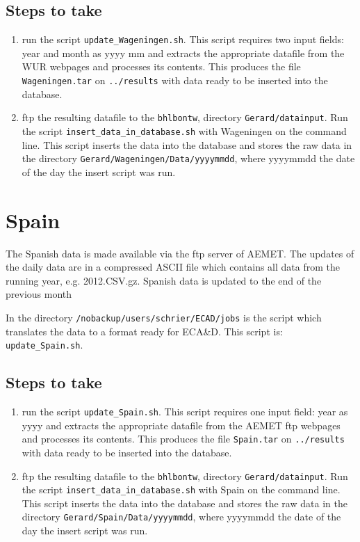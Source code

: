 \documentclass[a4paper]{article}
\begin{document}
\subsection*{Steps to take}

\begin{enumerate}
\item run the script \texttt{update\_Wageningen.sh}. This script requires two input fields: year and month
as yyyy mm and extracts the appropriate datafile from the WUR webpages and processes its contents. 
This produces the file \texttt{Wageningen.tar} on \texttt{../results} with data ready to be 
inserted into the database.
\item ftp the resulting datafile to the \texttt{bhlbontw},
directory \texttt{Gerard/datainput}. Run the script \texttt{insert\_data\_in\_database.sh} with Wageningen
on the command line. This script inserts the data into the database and stores the raw
data in the directory \texttt{Gerard/Wageningen/Data/yyyymmdd}, where yyyymmdd the date of the day the insert
script was run.
\end{enumerate}


\section{Spain}
The Spanish data is made available via the ftp server of AEMET. The updates of the daily data are in a compressed
ASCII file which contains all data from the running year, e.g. 2012.CSV.gz. Spanish data is updated to the end 
of the previous month

In the directory
\texttt{/nobackup/users/schrier/ECAD/jobs} is the script which translates the data to
a  format ready for ECA\&D.
This script is: \texttt{update\_Spain.sh}.

\subsection*{Steps to take}

\begin{enumerate}
\item run the script \texttt{update\_Spain.sh}. This script requires one input field: year 
as yyyy and extracts the appropriate datafile from the AEMET ftp webpages and processes its contents. 
This produces the file \texttt{Spain.tar} on \texttt{../results} with data ready to be 
inserted into the database.
\item ftp the resulting datafile to the \texttt{bhlbontw},
directory \texttt{Gerard/datainput}. Run the script \texttt{insert\_data\_in\_database.sh} with Spain
on the command line. This script inserts the data into the database and stores the raw
data in the directory \texttt{Gerard/Spain/Data/yyyymmdd}, where yyyymmdd the date of the day the insert
script was run.
\end{enumerate}
\end{document}
